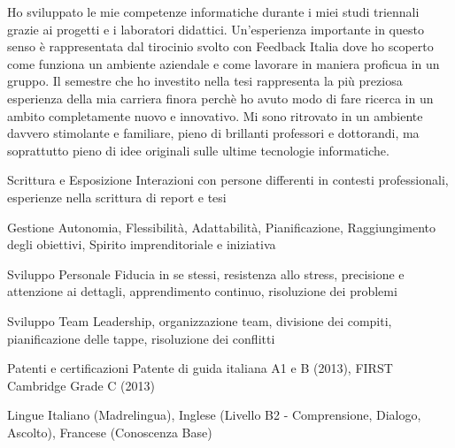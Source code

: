 {\begin{cvskills}
\end{cvskills}
\vspace{-5mm}
\begin{cvparagraph}
  Ho sviluppato le mie competenze informatiche durante i miei studi triennali grazie ai progetti e i laboratori didattici. Un'esperienza importante in questo senso è rappresentata dal tirocinio svolto con Feedback Italia dove ho scoperto come funziona un ambiente aziendale e come lavorare in maniera proficua in un gruppo. Il semestre che ho investito nella tesi rappresenta la più preziosa esperienza della mia carriera finora perchè ho avuto modo di fare ricerca in un ambito completamente nuovo e innovativo. Mi sono ritrovato in un ambiente davvero stimolante e familiare, pieno di brillanti professori e dottorandi, ma soprattutto pieno di idee originali sulle ultime tecnologie informatiche.
\end{cvparagraph}
\vspace{-3mm}
\begin{cvskills}

\cvskill
{Scrittura e Esposizione} %
{Interazioni con persone differenti in contesti professionali, esperienze nella scrittura di report e tesi} %

\cvskill
{Gestione} %
{Autonomia, Flessibilità, Adattabilità, Pianificazione, Raggiungimento degli obiettivi, Spirito imprenditoriale e iniziativa} %

\cvskill
{Sviluppo Personale} %
{Fiducia in se stessi, resistenza allo stress, precisione e attenzione ai dettagli, apprendimento continuo, risoluzione dei problemi} %

\cvskill
{Sviluppo Team} %
{Leadership, organizzazione team, divisione dei compiti, pianificazione delle tappe, risoluzione dei conflitti} %



\cvskill
{Patenti e certificazioni} %
{Patente di guida italiana A1 e B (2013), FIRST Cambridge Grade C (2013)} %


\cvskill
{Lingue} %
{Italiano (Madrelingua), Inglese (Livello B2 - Comprensione, Dialogo, Ascolto), Francese (Conoscenza Base)} %


\end{cvskills}}
